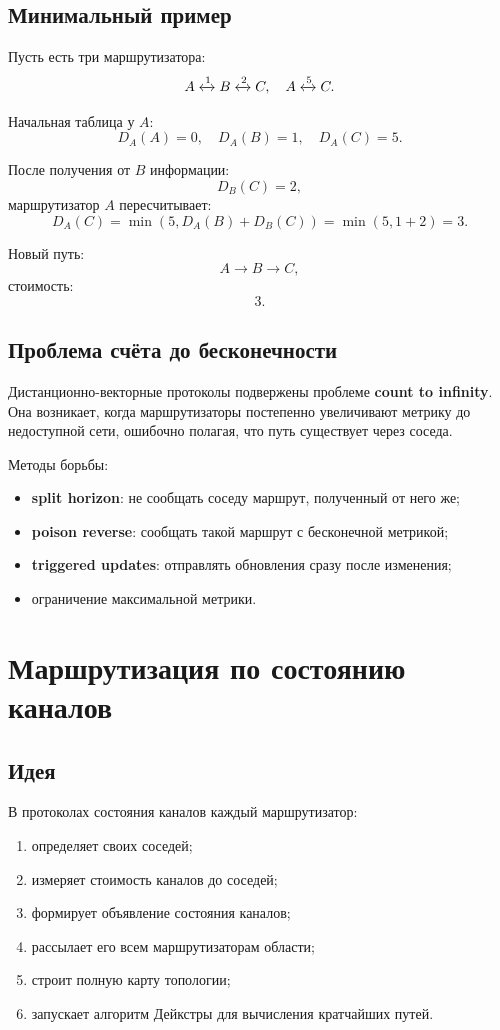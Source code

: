 \documentclass[12pt,a4paper]{article}
\begin{document}
\subsection{Минимальный пример}

Пусть есть три маршрутизатора:
\[
A \xleftrightarrow{1} B \xleftrightarrow{2} C,
\quad
A \xleftrightarrow{5} C.
\]

Начальная таблица у $A$:
\[
D_A(A)=0,\quad D_A(B)=1,\quad D_A(C)=5.
\]

После получения от $B$ информации:
\[
D_B(C)=2,
\]
маршрутизатор $A$ пересчитывает:
\[
D_A(C)=\min(5, D_A(B)+D_B(C))=\min(5,1+2)=3.
\]

Новый путь:
\[
A \to B \to C,
\]
стоимость:
\[
3.
\]

\subsection{Проблема счёта до бесконечности}

Дистанционно-векторные протоколы подвержены проблеме \textbf{count to infinity}. Она возникает, когда маршрутизаторы постепенно увеличивают метрику до недоступной сети, ошибочно полагая, что путь существует через соседа.

Методы борьбы:
\begin{itemize}
    \item \textbf{split horizon}: не сообщать соседу маршрут, полученный от него же;
    \item \textbf{poison reverse}: сообщать такой маршрут с бесконечной метрикой;
    \item \textbf{triggered updates}: отправлять обновления сразу после изменения;
    \item ограничение максимальной метрики.
\end{itemize}

\section{Маршрутизация по состоянию каналов}

\subsection{Идея}

В протоколах состояния каналов каждый маршрутизатор:
\begin{enumerate}
    \item определяет своих соседей;
    \item измеряет стоимость каналов до соседей;
    \item формирует объявление состояния каналов;
    \item рассылает его всем маршрутизаторам области;
    \item строит полную карту топологии;
    \item запускает алгоритм Дейкстры для вычисления кратчайших путей.
\end{enumerate}
\end{document}
